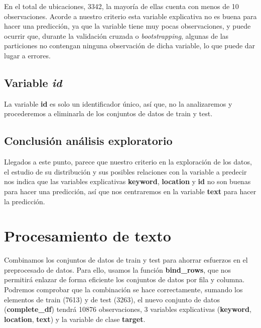 \documentclass[
]{article}
\newenvironment{Shaded}{\begin{snugshade}}{\end{snugshade}}
\newcommand{\NormalTok}[1]{#1}
\newcommand{\OperatorTok}[1]{\textcolor[rgb]{0.81,0.36,0.00}{\textbf{#1}}}
\newcommand{\OtherTok}[1]{\textcolor[rgb]{0.56,0.35,0.01}{#1}}
\newcommand{\StringTok}[1]{\textcolor[rgb]{0.31,0.60,0.02}{#1}}
\begin{document}
En el total de ubicaciones, 3342, la mayoría de ellas cuenta con menos
de 10 observaciones. Acorde a nuestro criterio esta variable explicativa
no es buena para hacer una predicción, ya que la variable tiene muy
pocas observaciones, y puede ocurrir que, durante la validación cruzada
o \emph{bootstrapping}, algunas de las particiones no contengan ninguna
observación de dicha variable, lo que puede dar lugar a errores.

\hypertarget{variable-id}{%
\subsection{\texorpdfstring{Variable
\emph{id}}{Variable id}}\label{variable-id}}

La variable \textbf{id} es solo un identificador único, así que, no la
analizaremos y procederemos a eliminarla de los conjuntos de datos de
train y test.

\begin{Shaded}
\end{Shaded}

\hypertarget{conclusiuxf3n-anuxe1lisis-exploratorio}{%
\subsection{Conclusión análisis
exploratorio}\label{conclusiuxf3n-anuxe1lisis-exploratorio}}

Llegados a este punto, parece que nuestro criterio en la exploración de
los datos, el estudio de su distribución y sus posibles relaciones con
la variable a predecir nos indica que las variables explicativas
\textbf{keyword}, \textbf{location} y \textbf{id} no son buenas para
hacer una predicción, así que nos centraremos en la variable
\textbf{text} para hacer la predicción.

\hypertarget{procesamiento-de-texto}{%
\section{Procesamiento de texto}\label{procesamiento-de-texto}}

Combinamos los conjuntos de datos de train y test para ahorrar esfuerzos
en el preprocesado de datos. Para ello, usamos la función
\textbf{bind\_rows}, que nos permitirá enlazar de forma eficiente los
conjuntos de datos por fila y columna. Podremos comprobar que la
combinación se hace correctamente, sumando los elementos de train (7613)
y de test (3263), el nuevo conjunto de datos (\textbf{complete\_df})
tendrá 10876 observaciones, 3 variables explicativas (\textbf{keyword},
\textbf{location}, \textbf{text}) y la variable de clase
\textbf{target}.
\end{document}
